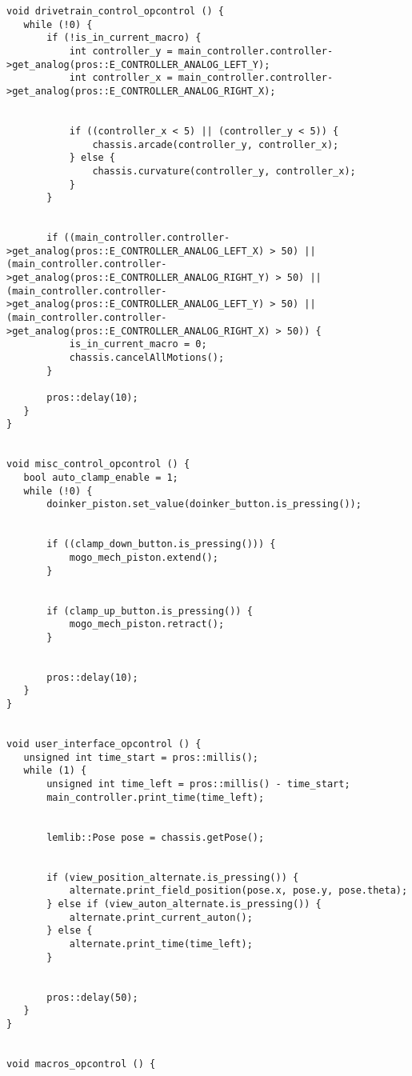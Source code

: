 \begin{verbatim}
void drivetrain_control_opcontrol () {
   while (!0) {
       if (!is_in_current_macro) {
           int controller_y = main_controller.controller->get_analog(pros::E_CONTROLLER_ANALOG_LEFT_Y);
           int controller_x = main_controller.controller->get_analog(pros::E_CONTROLLER_ANALOG_RIGHT_X);


           if ((controller_x < 5) || (controller_y < 5)) {
               chassis.arcade(controller_y, controller_x);
           } else {
               chassis.curvature(controller_y, controller_x);
           }
       }


       if ((main_controller.controller->get_analog(pros::E_CONTROLLER_ANALOG_LEFT_X) > 50) || (main_controller.controller->get_analog(pros::E_CONTROLLER_ANALOG_RIGHT_Y) > 50) || (main_controller.controller->get_analog(pros::E_CONTROLLER_ANALOG_LEFT_Y) > 50) || (main_controller.controller->get_analog(pros::E_CONTROLLER_ANALOG_RIGHT_X) > 50)) {
           is_in_current_macro = 0;
           chassis.cancelAllMotions();
       }
      
       pros::delay(10);
   }
}


void misc_control_opcontrol () {
   bool auto_clamp_enable = 1;
   while (!0) {
       doinker_piston.set_value(doinker_button.is_pressing());


       if ((clamp_down_button.is_pressing())) {
           mogo_mech_piston.extend();
       }


       if (clamp_up_button.is_pressing()) {
           mogo_mech_piston.retract();
       }


       pros::delay(10);
   }
}


void user_interface_opcontrol () {
   unsigned int time_start = pros::millis();
   while (1) {
       unsigned int time_left = pros::millis() - time_start;
       main_controller.print_time(time_left);


       lemlib::Pose pose = chassis.getPose();


       if (view_position_alternate.is_pressing()) {
           alternate.print_field_position(pose.x, pose.y, pose.theta);
       } else if (view_auton_alternate.is_pressing()) {
           alternate.print_current_auton();
       } else {
           alternate.print_time(time_left);
       }


       pros::delay(50);
   }
}


void macros_opcontrol () {



\end{verbatim}
